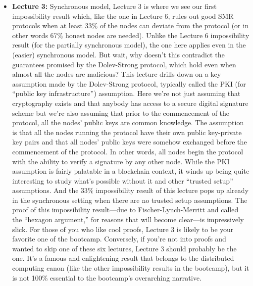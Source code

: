 \begin{itemize}
    \item \textbf{Lecture 3: }Synchronous model, Lecture 3 is where we see our first impossibility result which, like the one in Lecture 6, rules
    out good SMR protocols when at least 33\% of the nodes can deviate from the protocol (or in other words 67\% honest nodes are needed).
    Unlike the Lecture 6 impossibility result (for the partially synchronous model), the one here
    applies even in the (easier) synchronous model. But wait, why doesn’t this contradict the
    guarantees promised by the Dolev-Strong protocol, which hold even when almost all the
    nodes are malicious?
    This lecture drills down on a key assumption made by the Dolev-Strong protocol, typically
    called the PKI (for “public key infrastructure”) assumption. Here we're not just assuming that cryptography exists and that anybody has access to a secure digital signature scheme but we're also assuming that prior to the commencement of the protocol, all the nodes' public keys are common knowledge. The assumption is that all the
    nodes running the protocol have their own public key-private key pairs and that all nodes’
    public keys were somehow exchanged before the commencement of the protocol. In other
    words, all nodes begin the protocol with the ability to verify a signature by any other node.
    While the PKI assumption is fairly palatable in a blockchain context, it winds up being
    quite interesting to study what’s possible without it and other “trusted setup” assumptions.
    And the 33\% impossibility result of this lecture pops up already in the synchronous setting
    when there are no trusted setup assumptions. The proof of this impossibility result—due
    to Fischer-Lynch-Merritt and called the “hexagon argument,” for reasons that will become
    clear—is impressively slick. For those of you who like cool proofs, Lecture 3 is likely to be
    your favorite one of the bootcamp. Conversely, if you’re not into proofs and wanted to skip
    one of these six lectures, Lecture 3 should probably be the one. It’s a famous and enlightening
    result that belongs to the distributed computing canon (like the other impossibility results
    in the bootcamp), but it is not 100\% essential to the bootcamp’s overarching narrative.
    

\end{itemize}
